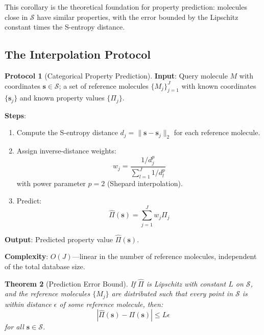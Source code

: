 \documentclass[11pt,twocolumn,a4paper]{article}
\newtheorem{theorem}{Theorem}[section]
\theoremstyle{definition}
\newtheorem{protocol}[theorem]{Protocol}
\theoremstyle{remark}
\newcommand{\Sspace}{\mathcal{S}}
\begin{document}
This corollary is the theoretical foundation for property prediction: molecules close in $\Sspace$ have similar properties, with the error bounded by the Lipschitz constant times the S-entropy distance.

\subsection{The Interpolation Protocol}

\begin{protocol}[Categorical Property Prediction]
\label{prot:property}
\textbf{Input}: Query molecule $M$ with coordinates $\mathbf{s} \in \Sspace$; a set of reference molecules $\{M_j\}_{j=1}^{J}$ with known coordinates $\{\mathbf{s}_j\}$ and known property values $\{\Pi_j\}$.

\textbf{Steps}:
\begin{enumerate}[nosep]
\item Compute the S-entropy distance $d_j = \|\mathbf{s} - \mathbf{s}_j\|_2$ for each reference molecule.
\item Assign inverse-distance weights:
\begin{equation}
w_j = \frac{1/d_j^p}{\sum_{l=1}^J 1/d_l^p}
\label{eq:idw_weights}
\end{equation}
with power parameter $p = 2$ (Shepard interpolation).
\item Predict:
\begin{equation}
\hat{\Pi}(\mathbf{s}) = \sum_{j=1}^{J} w_j \Pi_j
\label{eq:prediction}
\end{equation}
\end{enumerate}

\textbf{Output}: Predicted property value $\hat{\Pi}(\mathbf{s})$.

\textbf{Complexity}: $O(J)$---linear in the number of reference molecules, independent of the total database size.
\end{protocol}

\begin{theorem}[Prediction Error Bound]
\label{thm:prediction_error}
If $\hat{\Pi}$ is Lipschitz with constant $L$ on $\Sspace$, and the reference molecules $\{M_j\}$ are distributed such that every point in $\Sspace$ is within distance $\epsilon$ of some reference molecule, then:
\begin{equation}
|\hat{\Pi}(\mathbf{s}) - \Pi(\mathbf{s})| \leq L \epsilon
\label{eq:error_bound}
\end{equation}
for all $\mathbf{s} \in \Sspace$.
\end{theorem}
\end{document}
